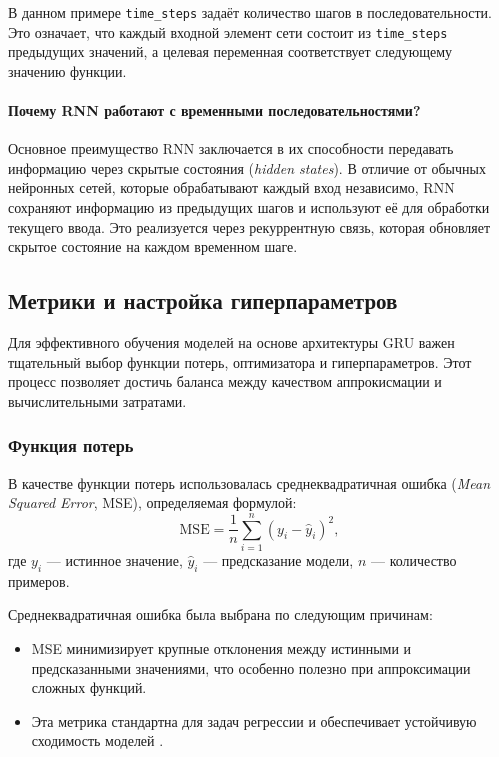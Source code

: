 В данном примере \texttt{time\_steps} задаёт количество шагов в последовательности. Это означает, что каждый входной элемент сети состоит из \texttt{time\_steps} предыдущих значений, а целевая переменная соответствует следующему значению функции.

\paragraph{Почему RNN работают с временными последовательностями?}
Основное преимущество RNN заключается в их способности передавать информацию через скрытые состояния (\textit{hidden states}). В отличие от обычных нейронных сетей, которые обрабатывают каждый вход независимо, RNN сохраняют информацию из предыдущих шагов и используют её для обработки текущего ввода. Это реализуется через рекуррентную связь, которая обновляет скрытое состояние на каждом временном шаге.



\subsection{Метрики и настройка гиперпараметров}
\label{subsec:metrics}

Для эффективного обучения моделей на основе архитектуры GRU важен тщательный выбор функции потерь, оптимизатора и гиперпараметров. Этот процесс позволяет достичь баланса между качеством аппрокисмации и вычислительными затратами.

\subsubsection{Функция потерь}

В качестве функции потерь использовалась среднеквадратичная ошибка (\textit{Mean Squared Error}, MSE), определяемая формулой:
\[
\text{MSE} = \frac{1}{n} \sum_{i=1}^{n} (y_i - \hat{y}_i)^2,
\]
где \( y_i \) — истинное значение, \( \hat{y}_i \) — предсказание модели, \( n \) — количество примеров.

Среднеквадратичная ошибка была выбрана по следующим причинам:
\begin{itemize}
    \item MSE минимизирует крупные отклонения между истинными и предсказанными значениями, что особенно полезно при аппроксимации сложных функций.
    \item Эта метрика стандартна для задач регрессии и обеспечивает устойчивую сходимость моделей \cite{Goodfellow}.
\end{itemize}

